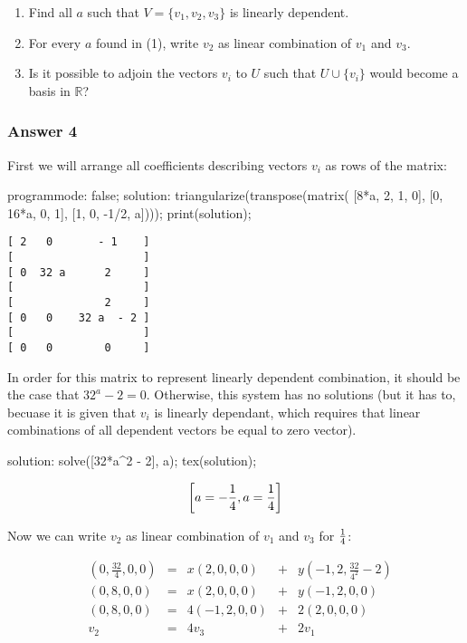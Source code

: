 \documentclass[11pt]{article}
\begin{document}
\begin{enumerate}
\item Find all $a$ such that $V = \{v_1, v_2, v_3\}$ is linearly dependent.
\item For every $a$ found in (1), write $v_2$ as linear combination of $v_1$
and $v_3$.
\item Is it possible to adjoin the vectors $v_i$ to $U$ such that 
      $U \cup \{v_i\}$ would become a basis in $\mathbb{R}$?
\end{enumerate}

\subsubsection{Answer 4}
\label{sec-1-4-1}

First we will arrange all coefficients describing vectors $v_i$ as rows of the
matrix:

\begin{maxima}
programmode: false;
solution: triangularize(transpose(matrix(
    [8*a, 2,    1,   0],
    [0,   16*a, 0,   1],
    [1,   0,   -1/2, a])));
print(solution);
\end{maxima}

\begin{verbatim}
[ 2   0       - 1    ]
[                    ]
[ 0  32 a      2     ]
[                    ] 
[              2     ]
[ 0   0    32 a  - 2 ]
[                    ]
[ 0   0        0     ]
\end{verbatim}

In order for this matrix to represent linearly dependent combination, it should
be the case that $32^a - 2 = 0$.  Otherwise, this system has no solutions (but
it has to, becuase it is given that $v_i$ is linearly dependant, which requires
that linear combinations of all dependent vectors be equal to zero vector).

\begin{maxima}
solution: solve([32*a^2 - 2], a);
tex(solution);
\end{maxima}

$$\left[ a=-{{1}\over{4}} , a={{1}\over{4}} \right] $$

Now we can write $v_2$ as linear combination of $v_1$ and $v_3$ for ${{1}\over{4}}$:

\begin{equation*}
\begin{alignedat}{5}
 & (0, \frac{32}{4}, 0, 0) &{}={}& x(2, 0, 0, 0)  &{}+{}& y(-1, 2, \frac{32}{4^2} - 2) \\
 & (0, 8, 0, 0)            &{}={}& x(2, 0, 0, 0)  &{}+{}& y(-1, 2, 0, 0) \\
 & (0, 8, 0, 0)            &{}={}& 4(-1, 2, 0, 0) &{}+{}& 2(2, 0, 0, 0)\\
 & v_2                     &{}={}& 4v_3           &{}+{}& 2v_1
\end{alignedat}
\end{equation*}
\end{document}
